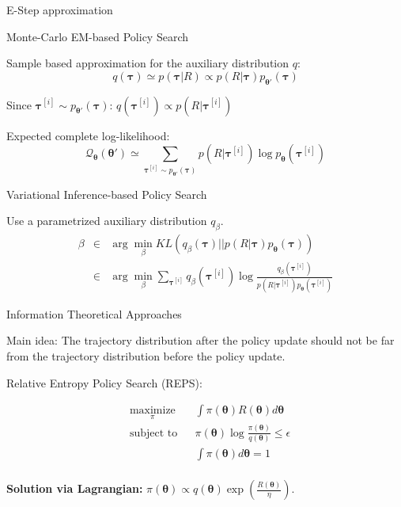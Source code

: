\documentclass[10pt]{beamer}
\begin{document}
\begin{frame}{E-Step approximation}

\begin{alertblock}{Monte-Carlo EM-based Policy Search}

Sample based approximation for the auxiliary distribution $q$:
$$q(\bm{\tau}) \simeq p(\bm{\tau}|R) \propto p(R | \bm{\tau}) p_{\bm{\theta}'}(\bm{\tau})$$

Since $\bm{\tau}^{[i]} \sim p_{\bm{\theta}'}(\bm{\tau})$:  $q(\bm{\tau}^{[i]}) \propto p(R | \bm{\tau}^{[i]})$

Expected complete log-likelihood:
$$\mathcal{Q}_{\bm{\theta}}(\bm{\theta}') \simeq \sum_{\bm{\tau}^{[i]} \sim p_{\bm{\theta}'}(\bm{\tau})} p(R | \bm{\tau}^{[i]}) \log p_{\bm{\theta}}(\bm{\tau}^{[i]}) $$
\end{alertblock}
\vspace{-1em}
\begin{alertblock}{Variational Inference-based Policy Search}

Use a parametrized auxiliary distribution $q_\beta$.
\begin{eqnarray*}
\beta &\in& \arg\min_\beta KL(q_{\beta}({\bm{\tau}}) || p(R | {\bm{\tau}}) p_{\bm{\theta}}({\bm{\tau}})) \\
&\in& \arg\min_\beta \sum_{{\bm{\tau}}^{[i]}} q_{\beta}({\bm{\tau}}^{[i]}) \log \frac{q_{\beta}({\bm{\tau}}^{[i]})} { p(R | {\bm{\tau}}^{[i]}) p_{\bm{\theta}}({\bm{\tau}}^{[i]})}
\end{eqnarray*}

\end{alertblock}

\end{frame}

\begin{frame}{Information Theoretical Approaches}

\begin{exampleblock}{Main idea:}
The trajectory distribution after the policy update should not be far from the trajectory distribution before the policy update.
\end{exampleblock}

\begin{alertblock}{Relative Entropy Policy Search (REPS):}

\begin{equation*}
\begin{aligned}
& \underset{\pi}{\text{maximize}}
& & \int \pi({\bm{\theta}}) R({\bm{\theta}}) d{\bm{\theta}} \\
& \text{subject to}
& & \pi({\bm{\theta}}) \log \frac{\pi({\bm{\theta}})}{q({\bm{\theta}})} \le  \epsilon \\
& & & \int \pi({\bm{\theta}}) d{\bm{\theta}} = 1  \\
\end{aligned}
\end{equation*}

\end{alertblock}

\textbf{Solution via Lagrangian:} $\pi({\bm{\theta}}) \propto q({\bm{\theta}}) \exp(\frac{R({\bm{\theta}})}{\eta})$.

\end{frame}
\end{document}
